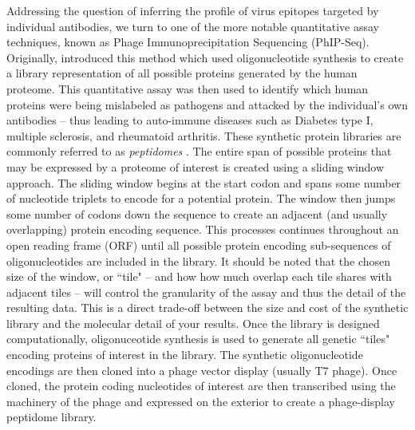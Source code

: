 \documentclass{article}
\begin{document}
Addressing the question of inferring the profile of virus epitopes targeted by individual antibodies, we turn to one of the more notable quantitative assay techniques, known as Phage Immunoprecipitation Sequencing (PhIP-Seq).
Originally, \citet{Larman2011} introduced this method which used oligonucleotide synthesis to create a library representation of all possible proteins generated by the human proteome.
This quantitative assay was then used to identify which human proteins were being mislabeled as pathogens and attacked by the individual's own antibodies -- thus leading to auto-immune diseases such as Diabetes type I, multiple sclerosis, and rheumatoid arthritis.
These synthetic protein libraries are commonly referred to as \textit{peptidomes} \citep{Mohan2018}.
The entire span of possible proteins that may be expressed by a proteome of interest is created using a sliding window approach.
The sliding window begins at the start codon and spans some number of nucleotide triplets to encode for a potential protein.
The window then jumps some number of codons down the sequence to create an adjacent (and usually overlapping) protein encoding sequence.
This processes continues throughout an open reading frame (ORF) until all possible protein encoding sub-sequences of oligonucleotides are included in the library.
It should be noted that the chosen size of the window, or ``tile" -- and how how much overlap each tile shares with adjacent tiles -- will control the granularity of the assay and thus the detail of the resulting data.
This is a direct trade-off between the size and cost of the synthetic library and the molecular detail of your results.
Once the library is designed computationally, oligonuceotide synthesis is used to generate all genetic ``tiles"  encoding proteins of interest in the library.
The synthetic oligonucleotide encodings are then cloned into a phage vector display (usually T7 phage). 
Once cloned, the protein coding nucleotides of interest are then transcribed using the machinery of the phage and expressed on the exterior to create a phage-display peptidome library.
\end{document}
